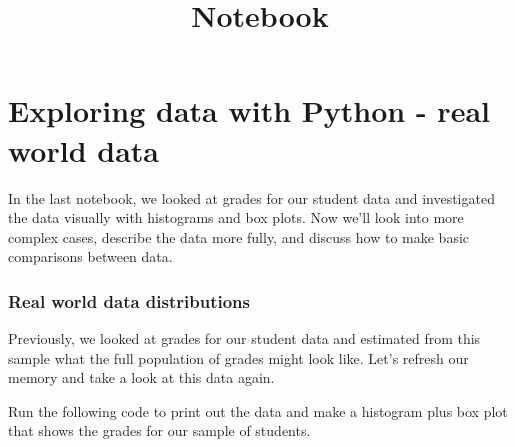 \documentclass[11pt]{article}
\title{Notebook}
\begin{document}
    
    \maketitle
    
    

    
    \hypertarget{exploring-data-with-python---real-world-data}{%
\section{Exploring data with Python - real world
data}\label{exploring-data-with-python---real-world-data}}

In the last notebook, we looked at grades for our student data and
investigated the data visually with histograms and box plots. Now we'll
look into more complex cases, describe the data more fully, and discuss
how to make basic comparisons between data.

\hypertarget{real-world-data-distributions}{%
\subsubsection{Real world data
distributions}\label{real-world-data-distributions}}

Previously, we looked at grades for our student data and estimated from
this sample what the full population of grades might look like. Let's
refresh our memory and take a look at this data again.

Run the following code to print out the data and make a histogram plus
box plot that shows the grades for our sample of students.
\end{document}
